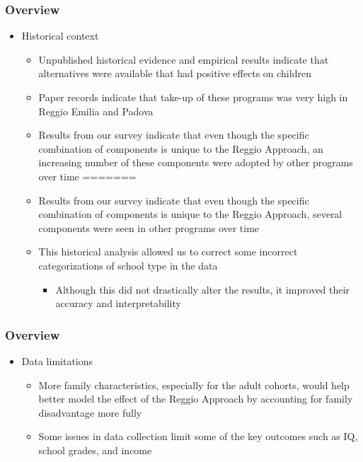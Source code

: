 \documentclass[static]{JJH-Beamer_PAGENOS}
\begin{document}
\begin{frame}
\frametitle{Overview}
\begin{itemize}
	\item Historical context
	\begin{itemize}
		\item Unpublished historical evidence and empirical results indicate that alternatives were available that had positive effects on children
		\item Paper records indicate that take-up of these programs was very high in Reggio Emilia and Padova
		\item Results from our survey indicate that even though the specific combination of components is unique to the Reggio Approach, an increasing number of these components were adopted by other programs over time
=======
		\item Results from our survey indicate that even though the specific combination of components is unique to the Reggio Approach, several components were seen in other programs over time
		\item This historical analysis allowed us to correct some incorrect categorizations of school type in the data
		\begin{itemize}
			\item Although this did not drastically alter the results, it improved their accuracy and interpretability
		\end{itemize}
	\end{itemize}
\end{itemize}
\end{frame}

\begin{frame}
\frametitle{Overview}
\begin{itemize}
	\item Data limitations
	\begin{itemize}
		\item More family characteristics, especially for the adult cohorts, would help better model the effect of the Reggio Approach by accounting for family disadvantage more fully
		\item Some issues in data collection limit some of the key outcomes such as IQ, school grades, and income
	\end{itemize}
\end{itemize}
\end{frame}
\end{document}
